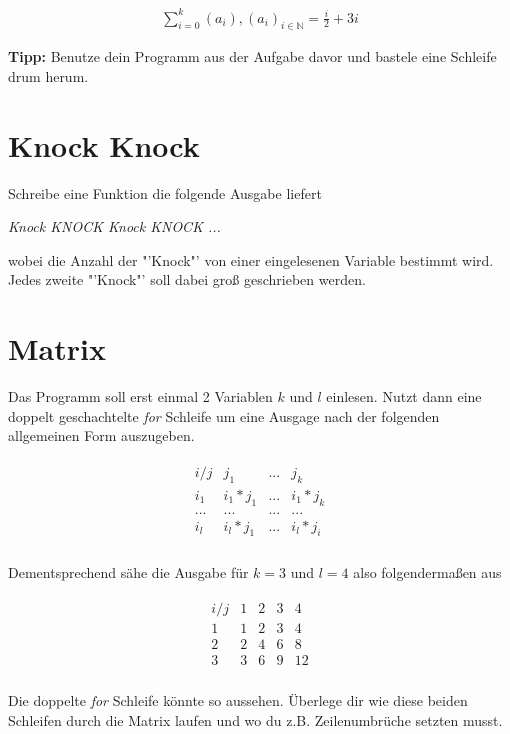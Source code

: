 \documentclass[c_worksheet.tex]{subfiles}
\begin{document}
\begin{align*}
 	\sum_{i=0}^k (a_i),    (a_i)_{i \in \mathbb{N} } = \frac{i}{2} + 3i 
 \end{align*} 

\textbf{Tipp: } Benutze dein Programm aus der Aufgabe davor und bastele eine Schleife drum herum.


\section{Knock Knock}

Schreibe eine Funktion die folgende Ausgabe liefert

\begin{center}
\textit{Knock KNOCK Knock KNOCK ... }
\end{center}

wobei die Anzahl der "'Knock"' von einer eingelesenen Variable bestimmt wird. Jedes zweite "'Knock"' soll dabei groß geschrieben werden.  


\section{Matrix}

Das Programm soll erst einmal 2 Variablen \(k\) und \(l\) einlesen. Nutzt dann eine doppelt geschachtelte \emph{for} Schleife um eine Ausgage nach der folgenden allgemeinen Form auszugeben.

\begin{align*}
\begin{matrix}
i / j  & j_1     & ... & j_k       \\
i_1    & i_1*j_1 & ... & i_1 * j_k \\
...    & ...     & ... & ...       \\
i_l    & i_l*j_1 & ... & i_l*j_i   \\
\end{matrix}
\end{align*}

Dementsprechend sähe die Ausgabe für \(k=3\) und \(l=4\) also folgendermaßen aus

\begin{align*}
\begin{matrix}
i / j & 1 & 2 & 3 &  4 \\
    1 & 1 & 2 & 3 &  4 \\
    2 & 2 & 4 & 6 &  8 \\
    3 & 3 & 6 & 9 & 12 \\
\end{matrix}
\end{align*}

Die doppelte \emph{for} Schleife könnte so aussehen. Überlege dir wie diese beiden Schleifen durch die Matrix laufen und wo du z.B. Zeilenumbrüche setzten musst.

 
\end{document}
